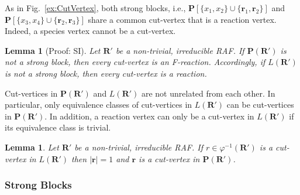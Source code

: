 \documentclass[pdflatex]{sn-jnl}
\theoremstyle{thmstyleone}%
\newtheorem{lemma}[theorem]{Lemma}%
\theoremstyle{examplesty}%
\theoremstyle{thmstylethree}%
\newcommand{\princess}{\mathbf{P}}
\newcommand{\lord}{L}
\newcommand{\fr}[0]{\mathbf{r}}
\newcommand{\RAF}[0]{\mathbf{R}'}
\begin{document}
As in Fig.~\ref{ex:CutVertex}, both strong blocks, i.e.,
$\princess[\{x_1,x_2\}\cup \{\fr_1,\fr_2\}]$ and $\princess[\{x_3,x_4\}\cup
  \{\fr_2,\fr_3\}]$ share a common cut-vertex that is a reaction
vertex. Indeed, a species vertex cannot be a cut-vertex.
\vspace{6pt}
\begin{lemma}[Proof: SI]\label{lem:CutVertexReac}
  Let $\RAF$ be a non-trivial, irreducible RAF. If $\princess(\RAF)$ is not
  a strong block, then every cut-vertex is an F-reaction. Accordingly, if
  $\lord(\RAF)$ is not a strong block, then every cut-vertex is a reaction.
\end{lemma}
\vspace{6pt}

Cut-vertices in $\princess(\RAF)$ and $\lord(\RAF)$ are not unrelated from
each other. In particular, only equivalence classes of cut-vertices in
$\lord(\RAF)$ can be cut-vertices in $\princess(\RAF)$. In addition, a
reaction vertex can only be a cut-vertex in $\lord(\RAF)$ if its
equivalence class is trivial.
\vspace{6pt}
\begin{lemma}\label{lem:CutVertPP}
  Let $\RAF$ be a non-trivial, irreducible RAF. If $r \in
  \varphi^{-1}(\RAF)$ is a cut-vertex in $\lord(\RAF)$ then $|\fr|=1$ and
  $\fr$ is a cut-vertex in $\princess(\RAF)$.
\end{lemma}

\subsubsection{Strong Blocks}
\end{document}
